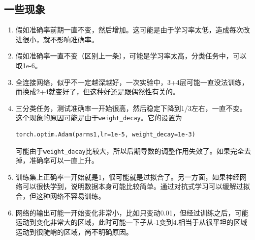 \subsection{一些现象}
\begin{enumerate}
\item 假如准确率前期一直不变，然后增加。这可能是由于学习率太低，造成每次改进很小，就不影响准确率。
\item 假如准确率一直不变（区别上一条），可能是学习率太高，分类任务中，可以取1e-6。
\item 全连接网络，似乎不一定越深越好，一次实验中，3+4层可能一直没法训练，而换成2+4就变好了，但这种好还是跟偶然性有关的。
\item 三分类任务，测试准确率一开始很高，然后稳定下降到1/3左右，一直不变。这个现象的原因可能是由于\texttt{weight\_decay}。它的设置为
\begin{verbatim}
torch.optim.Adam(parms1,lr=1e-5, weight_decay=1e-3)
\end{verbatim}
可能由于\texttt{weight\_dacay}比较大，所以后期导数的调整作用失效了。如果完全去掉，准确率可以一直上升。
\item 训练集上正确率一开始就是1，很可能就是过拟合了。另一方面，如果神经网络可以很快学到，说明数据本身可能比较简单。通过对抗式学习可以缓解过拟合，但这种网络不容易训练。
\item 网络的输出可能一开始变化非常小，比如只变动0.01，但经过训练之后，可能运动到变化非常大的区域，此时可能一下子从-1变到4.相当于从很平坦的区域运动到很陡峭的区域，尚不明确原因。
\end{enumerate}
